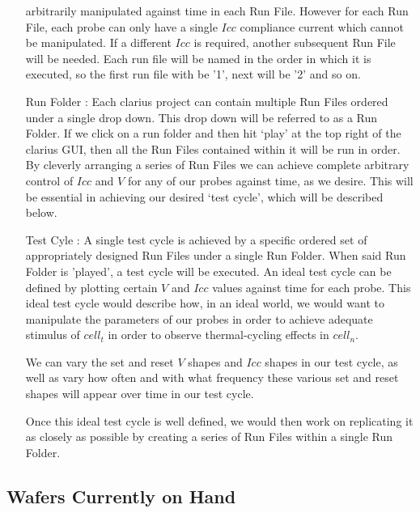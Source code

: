 \documentclass{article}
\begin{document}
\begin{enumerate}
            arbitrarily manipulated against time in each Run File. However for each Run File, each probe can only have a
            single $Icc$ compliance current which cannot be manipulated. If a different $Icc$ is required, another
            subsequent Run File will be needed. Each run file will be named in the order in which it is executed, so the
            first run file with be '1', next will be '2' and so on.
          \item[Run Folder :] Each clarius project can contain multiple Run Files ordered under a single drop down. This
            drop down will be referred to as a Run Folder. If we click on a run folder and then hit `play' at the top
            right of the clarius GUI, then all the Run Files contained within it will be run in order. By cleverly
            arranging a series of Run Files we can achieve complete arbitrary control of $Icc$ and $V$ for any of our
            probes against time, as we desire. This will be essential in achieving our desired `test cycle', which will
            be described below.
          \item[Test Cyle :] A single test cycle is achieved by a specific ordered set of appropriately designed Run
            Files under a single Run Folder. When said Run Folder is 'played', a test cycle will be executed. An ideal
            test cycle can be defined by plotting certain $V$ and $Icc$ values against time for each probe. This ideal
            test cycle would describe how, in an ideal world, we would want to manipulate the parameters of our probes
            in order to achieve adequate stimulus of $cell_t$ in order to observe thermal-cycling effects in $cell_n$. 
            
            We can vary the set and reset $V$ shapes and $Icc$ shapes in our test cycle, as well as vary how often and
            with what frequency these various set and reset shapes will appear over time in our test cycle.
      
            Once this ideal test cycle is well defined, we would then work on replicating it as closely as possible by
            creating a series of Run Files within a single Run Folder.
        \end{enumerate}

      \subsection{Wafers Currently on Hand} \label{wafers}
\end{document}
